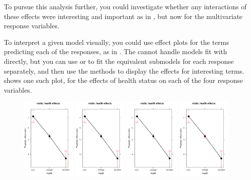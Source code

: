 \documentclass[11pt]{book}\usepackage[]{graphicx}\usepackage[]{color}
\begin{document}
To pursue this analysis further, you could investigate whether any interactions of these
effects were interesting and important as in , but now for the multivariate
response variables.

To interpret a given model visually, you could use effect plots for the terms predicting each of
the responses, as in .  The  cannot handle models fit with
 directly, but you can use  or  to fit the equivalent
submodels for each response separately, and then use the  methods
to display the effects for interesting terms.  shows one such
plot, for the effects of health status on each of the four response variables.

\begin{figure}[htb]
  \includegraphics[page=1, width=0.24\textwidth, clip]{ch09/fig/nmes-eff-health.pdf}
  \includegraphics[page=2, width=0.24\textwidth, clip]{ch09/fig/nmes-eff-health.pdf}
  \includegraphics[page=3, width=0.24\textwidth, clip]{ch09/fig/nmes-eff-health.pdf}
  \includegraphics[page=4, width=0.24\textwidth, clip]{ch09/fig/nmes-eff-health.pdf}

\end{figure}
\end{document}
